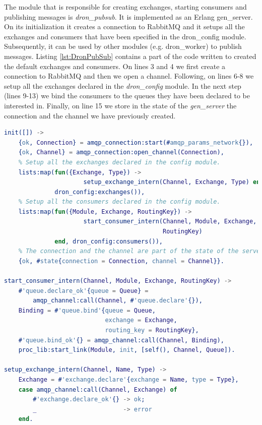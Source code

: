 \documentclass[11pt,a4paper,twoside]{report}
\begin{document}
The module that is responsible for creating exchanges, starting consumers and publishing messages is \textit{dron\_pubsub}. It is implemented as an Erlang gen\_server. On its initialization it creates a connection to RabbitMQ and it setups all the exchanges and consumers that have been specified in the dron\_config module. Subsequently, it can be used by other modules (e.g. dron\_worker) to publish messages. Listing \ref{lst:DronPubSub} contains a part of the code written to created the default exchanges and consumers. On lines 3 and 4 we first create a connection to RabbitMQ and then we open a channel. Following, on lines 6-8 we setup all the exchanges declared in the \textit{dron_config} module. In the next step (lines 9-13) we bind the consumers to the queues they have been declared to be interested in. Finally, on line 15 we store in the state of the \textit{gen\_server} the connection and the channel we have previously created.\newpage


\begin{lstlisting}[language=Erlang,caption={Publisher/Subscriber usage},
label={lst:DronPubSub}]
% Function called on the initialization of the server.
init([]) ->
    {ok, Connection} = amqp_connection:start(#amqp_params_network{}),
    {ok, Channel} = amqp_connection:open_channel(Connection),
    % Setup all the exchanges declared in the config module.
    lists:map(fun({Exchange, Type}) ->
                      setup_exchange_intern(Channel, Exchange, Type) end,
              dron_config:exchanges()),
    % Setup all the consumers declared in the config module.
    lists:map(fun({Module, Exchange, RoutingKey}) ->
                      start_consumer_intern(Channel, Module, Exchange,
                                            RoutingKey)
              end, dron_config:consumers()),
    % The connection and the channel are part of the state of the server.
    {ok, #state{connection = Connection, channel = Channel}}.

start_consumer_intern(Channel, Module, Exchange, RoutingKey) ->
    #'queue.declare_ok'{queue = Queue} =
        amqp_channel:call(Channel, #'queue.declare'{}),
    Binding = #'queue.bind'{queue = Queue,
                            exchange = Exchange,
                            routing_key = RoutingKey},
    #'queue.bind_ok'{} = amqp_channel:call(Channel, Binding),
    proc_lib:start_link(Module, init, [self(), Channel, Queue]).

setup_exchange_intern(Channel, Name, Type) ->
    Exchange = #'exchange.declare'{exchange = Name, type = Type},
    case amqp_channel:call(Channel, Exchange) of
        #'exchange.declare_ok'{} -> ok;
        _                        -> error
    end.
\end{lstlisting}
\end{document}
